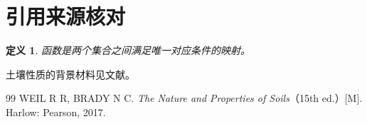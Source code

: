 \documentclass{ctexart}
\newtheorem{definition}{定义}
\begin{document}
\section{引用来源核对}
\begin{definition}函数是两个集合之间满足唯一对应条件的映射。\end{definition}
土壤性质的背景材料见文献\cite{BradyWeil}。

\begin{thebibliography}{99}
 WEIL R R, BRADY N C. \emph{The Nature and Properties of Soils}（15th ed.）[M]. Harlow: Pearson, 2017.
\end{thebibliography}
\end{document}
